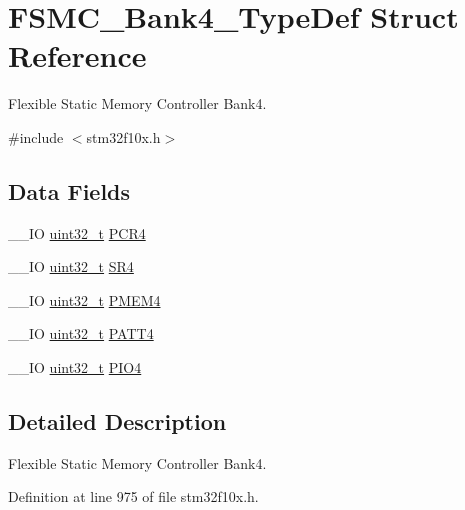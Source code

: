 \hypertarget{struct_f_s_m_c___bank4___type_def}{\section{F\-S\-M\-C\-\_\-\-Bank4\-\_\-\-Type\-Def Struct Reference}
\label{struct_f_s_m_c___bank4___type_def}
}


Flexible Static Memory Controller Bank4.  




{\ttfamily \#include $<$stm32f10x.\-h$>$}

\subsection*{Data Fields}
\begin{DoxyCompactItemize}
\item 
\-\_\-\-\_\-\-I\-O \hyperlink{stdint_8h_a435d1572bf3f880d55459d9805097f62}{uint32\-\_\-t} \hyperlink{struct_f_s_m_c___bank4___type_def_a0470b5bbb53e9f1bbde09829371eb72f}{P\-C\-R4}
\item 
\-\_\-\-\_\-\-I\-O \hyperlink{stdint_8h_a435d1572bf3f880d55459d9805097f62}{uint32\-\_\-t} \hyperlink{struct_f_s_m_c___bank4___type_def_a1e0f09be7fa48bb7b14233866da1dd9f}{S\-R4}
\item 
\-\_\-\-\_\-\-I\-O \hyperlink{stdint_8h_a435d1572bf3f880d55459d9805097f62}{uint32\-\_\-t} \hyperlink{struct_f_s_m_c___bank4___type_def_a4ed4ce751e7a8b3207bd20675b1d9085}{P\-M\-E\-M4}
\item 
\-\_\-\-\_\-\-I\-O \hyperlink{stdint_8h_a435d1572bf3f880d55459d9805097f62}{uint32\-\_\-t} \hyperlink{struct_f_s_m_c___bank4___type_def_a4cccc7802b573135311cc38e7f247ff5}{P\-A\-T\-T4}
\item 
\-\_\-\-\_\-\-I\-O \hyperlink{stdint_8h_a435d1572bf3f880d55459d9805097f62}{uint32\-\_\-t} \hyperlink{struct_f_s_m_c___bank4___type_def_a531ebc38c47bebfb198eafb4de24cb2a}{P\-I\-O4}
\end{DoxyCompactItemize}


\subsection{Detailed Description}
Flexible Static Memory Controller Bank4. 

Definition at line 975 of file stm32f10x.\-h.



